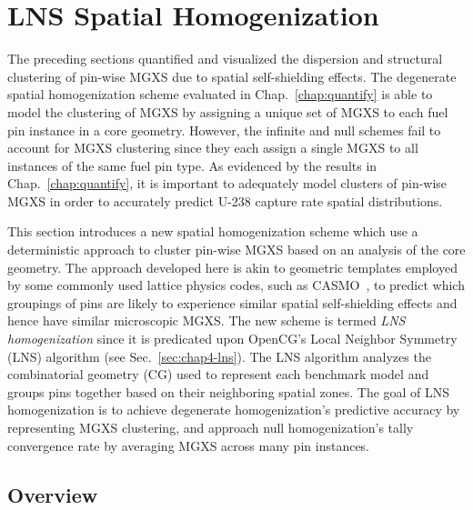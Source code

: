 \section{LNS Spatial Homogenization}
\label{sec:chap9-lns-homogenize}

The preceding sections quantified and visualized the dispersion and structural clustering of pin-wise \ac{MGXS} due to spatial self-shielding effects. The degenerate spatial homogenization scheme evaluated in Chap.~\ref{chap:quantify} is able to model the clustering of \ac{MGXS} by assigning a unique set of \ac{MGXS} to each fuel pin instance in a core geometry. However, the infinite and null schemes fail to account for \ac{MGXS} clustering since they each assign a single \ac{MGXS} to all instances of the same fuel pin type. As evidenced by the results in Chap.~\ref{chap:quantify}, it is important to adequately model clusters of pin-wise \ac{MGXS} in order to accurately predict U-238 capture rate spatial distributions. 

This section introduces a new spatial homogenization scheme which use a deterministic  approach to cluster pin-wise \ac{MGXS} based on an analysis of the core geometry. The approach developed here is akin to geometric templates employed by some commonly used lattice physics codes, such as CASMO~\cite{rhodes2006casmo}, to predict which groupings of pins are likely to experience similar spatial self-shielding effects and hence have similar microscopic \ac{MGXS}. The new scheme is termed \textit{\ac{LNS} homogenization} since it is predicated upon OpenCG's Local Neighbor Symmetry (LNS) algorithm (see Sec.~\ref{sec:chap4-lns}). The \ac{LNS} algorithm analyzes the combinatorial geometry (CG) used to represent each benchmark model and groups pins together based on their neighboring spatial zones. The goal of \ac{LNS} homogenization is to achieve degenerate homogenization's predictive accuracy by representing \ac{MGXS} clustering, and approach null homogenization's tally convergence rate by averaging \ac{MGXS} across many pin instances.

\subsection{Overview}
\label{subsec:chap9-lns-overview}

